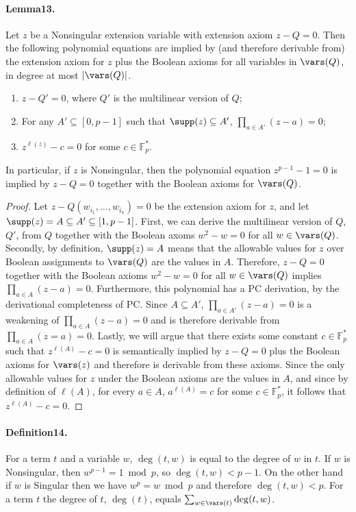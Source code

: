 \paragraph{Lemma13.} Let $z$ be a Nonsingular extension variable with extension axiom $z-Q=0$. Then the following polynomial equations are implied by (and therefore derivable from) the extension axiom for $z$ plus the Boolean axioms for all variables in $\vars(Q)$, in degree at most $|\vars(Q)|$.
\begin{enumerate}
\item $z-Q'=0$, where $Q'$ is the multilinear version of $Q$;
\item For any $A'\subseteq[0,p-1]$ such that $\supp(z)\subseteq A'$, $\prod_{a\in A'}(z-a)=0$;
\item $z^{\ell(z)}-c=0$ for some $c\in\mathbb F_p^*$.
\end{enumerate}
In particular, if $z$ is Nonsingular, then the polynomial equation $z^{p-1}-1=0$ is implied by $z-Q=0$ together with the Boolean axioms for $\vars(Q)$.
\begin{proof}
Let $z-Q(w_{i_1},\ldots,w_{i_{\kappa}})=0$ be the extension axiom for $z$, and let $\supp(z)=A\subseteq A'\subseteq[1,p-1]$. First, we can derive the multilinear version of $Q$, $Q'$, from $Q$ together with the Boolean axoms $w^2-w=0$ for all $w\in\vars(Q)$. Secondly, by definition, $\supp(z)=A$ means that the allowable values for $z$ over Boolean assignments to $\vars(Q)$ are the values in $A$. Therefore, $z-Q=0$ together with the Boolean axioms $w^2-w=0$ for all $w\in\vars(Q)$ implies $\prod_{a\in A}(z-a)=0$. Furthermore, this polynomial has a PC derivation, by the derivational completeness of PC. Since $A\subseteq A'$, $\prod_{a\in A'}(z-a)=0$ is a weakening of $\prod_{a\in A}(z-a)=0$ and is therefore derivable from $\prod_{a\in A}(z=a)=0$. Lastly, we will argue that there exists some constant $c\in\mathbb F_p^*$ such that $z^{\ell(A)}-c=0$ is semantically implied by $z-Q=0$ plus the Boolean axioms for $\vars(z)$ and therefore is derivable from these axioms. Since the only allowable values for $z$ under the Boolean axioms are the values in $A$, and since by definition of $\ell(A)$, for every $a\in A$, $a^{\ell(A)}=c$ for some $c\in\mathbb F_p^*$, it follows that $z^{\ell(A)}-c=0$.
\end{proof}
\paragraph{Definition14.} For a term $t$ and a variable $w$, $\deg(t,w)$ is equal to the degree of $w$ in $t$. If $w$ is Nonsingular, then $w^{p-1}=1\bmod p$, so $\deg(t,w)<p-1$. On the other hand if $w$ is Singular then we have $w^p=w\bmod p$ and therefore $\deg(t,w)<p$. For a term $t$ the degree of $t$, $\deg(t)$, equals $\sum_{w\in\vars(t)}\deg(t,w)$.
